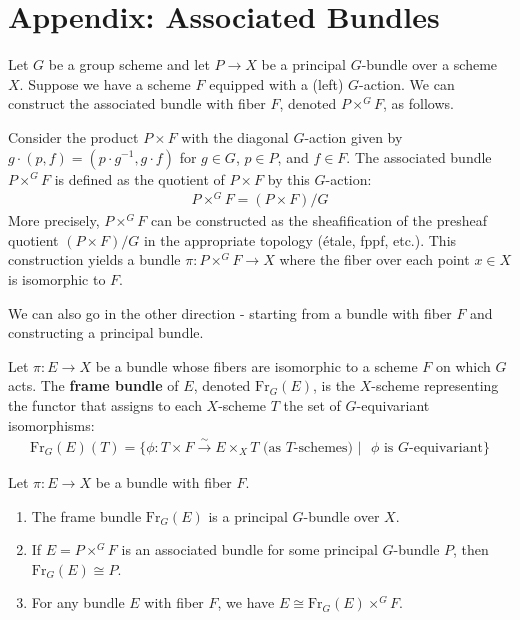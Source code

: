 \documentclass[12pt]{article}
\begin{document}
\section{Appendix: Associated Bundles}

Let $G$ be a group scheme and let $P \to X$ be a principal $G$-bundle over a scheme $X$. Suppose we have a scheme $F$ equipped with a (left) $G$-action. We can construct the associated bundle with fiber $F$, denoted $P \times^G F$, as follows.

Consider the product $P \times F$ with the diagonal $G$-action given by $g \cdot (p, f) = (p \cdot g^{-1}, g \cdot f)$ for $g \in G$, $p \in P$, and $f \in F$. The associated bundle $P \times^G F$ is defined as the quotient of $P \times F$ by this $G$-action:
\begin{align*}
    P \times^G F = (P \times F)/G
\end{align*}
More precisely, $P \times^G F$ can be constructed as the sheafification of the presheaf quotient $(P \times F)/G$ in the appropriate topology (étale, fppf, etc.). This construction yields a bundle $\pi: P \times^G F \to X$ where the fiber over each point $x \in X$ is isomorphic to $F$.

We can also go in the other direction - starting from a bundle with fiber $F$ and constructing a principal bundle.

\begin{definition}
    Let $\pi: E \to X$ be a bundle whose fibers are isomorphic to a scheme $F$ on which $G$ acts. The \textbf{frame bundle} of $E$, denoted $\text{Fr}_G(E)$, is the $X$-scheme representing the functor that assigns to each $X$-scheme $T$ the set of $G$-equivariant isomorphisms:
    \begin{align*}
        \text{Fr}_G(E)(T) = \{\phi: T \times F \stackrel{\sim}{\to} E \times_X T \text{ (as $T$-schemes) } | \text{ $\phi$ is $G$-equivariant}\}
    \end{align*}
\end{definition}

\begin{proposition}
    Let $\pi: E \to X$ be a bundle with fiber $F$.
    \begin{enumerate}
        \item The frame bundle $\text{Fr}_G(E)$ is a principal $G$-bundle over $X$.
        \item If $E = P \times^G F$ is an associated bundle for some principal $G$-bundle $P$, then $\text{Fr}_G(E) \cong P$.
        \item For any bundle $E$ with fiber $F$, we have $E \cong \text{Fr}_G(E) \times^G F$.
    \end{enumerate}
\end{proposition}
\end{document}
